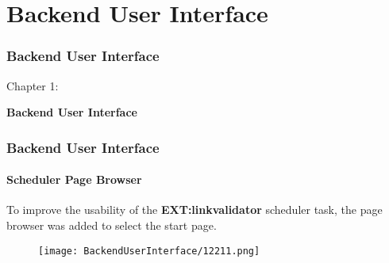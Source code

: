 %

\section{Backend User Interface}
\begin{frame}[fragile]
	\frametitle{Backend User Interface}

	\begin{center}\huge{Chapter 1:}\end{center}
	\begin{center}\huge{\color{typo3darkgrey}\textbf{Backend User Interface}}\end{center}

\end{frame}

\begin{frame}[fragile]
	\frametitle{Backend User Interface}
	\framesubtitle{Scheduler Page Browser}

	To improve the usability of the \textbf{EXT:linkvalidator} scheduler task,
	the page browser was added to select the start page.

	\begin{figure}\vspace{-0.2cm}
		\texttt{[image: BackendUserInterface/12211.png]}
	\end{figure}

\end{frame}


